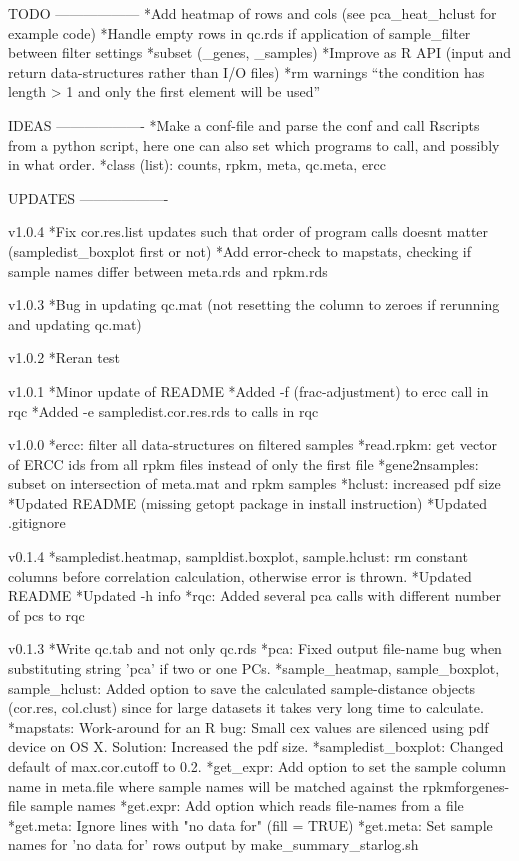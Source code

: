 

TODO
------------------
*Add heatmap of rows and cols (see pca_heat_hclust for example code)
*Handle empty rows in qc.rds if application of sample_filter between filter settings
*subset (_genes, _samples)
*Improve as R API (input and return data-structures rather than I/O files)
*rm warnings ``the condition has length > 1 and only the first element will be used''



IDEAS
-------------------
*Make a conf-file and parse the conf and call Rscripts from a python script, here one can also set which programs to call, and possibly in what order.
*class (list): counts, rpkm, meta, qc.meta, ercc



UPDATES
-------------------

v1.0.4
*Fix cor.res.list updates such that order of program calls doesnt matter (sampledist_boxplot first or not)
*Add error-check to mapstats, checking if sample names differ between meta.rds and rpkm.rds

v1.0.3
*Bug in updating qc.mat (not resetting the column to zeroes if rerunning and updating qc.mat)

v1.0.2
*Reran test

v1.0.1
*Minor update of README
*Added -f (frac-adjustment) to ercc call in rqc
*Added -e sampledist.cor.res.rds to calls in rqc

v1.0.0
*ercc: filter all data-structures on filtered samples
*read.rpkm: get vector of ERCC ids from all rpkm files instead of only the first file
*gene2nsamples: subset on intersection of meta.mat and rpkm samples
*hclust: increased pdf size
*Updated README (missing getopt package in install instruction)
*Updated .gitignore

v0.1.4
*sampledist.heatmap, sampldist.boxplot, sample.hclust: rm constant columns before correlation calculation, otherwise error is thrown.
*Updated README
*Updated -h info
*rqc: Added several pca calls with different number of pcs to rqc

v0.1.3
*Write qc.tab and not only qc.rds
*pca: Fixed output file-name bug when substituting string 'pca' if two or one PCs.
*sample_heatmap, sample_boxplot, sample_hclust: Added option to save the calculated sample-distance objects (cor.res, col.clust) since for large datasets it takes very long time to calculate.
*mapstats: Work-around for an R bug: Small cex values are silenced using pdf device on OS X. Solution: Increased the pdf size.
*sampledist_boxplot: Changed default of max.cor.cutoff to 0.2.
*get_expr: Add option to set the sample column name in meta.file where sample names will be matched against the rpkmforgenes-file sample names
*get.expr: Add option which reads file-names from a file
*get.meta: Ignore lines with "no data for" (fill = TRUE)
*get.meta: Set sample names for 'no data for' rows output by make_summary_starlog.sh


